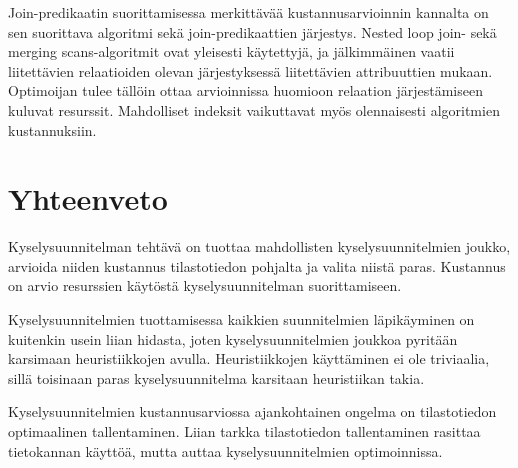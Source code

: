 \documentclass[finnish]{tktltiki2}
\theoremstyle{definition}
\theoremstyle{remark}
\begin{document}
Join-predikaatin suorittamisessa merkittävää kustannusarvioinnin kannalta on sen suorittava algoritmi sekä join-predikaattien järjestys. Nested loop join- sekä merging scans-algoritmit ovat yleisesti käytettyjä, ja jälkimmäinen vaatii liitettävien relaatioiden olevan järjestyksessä liitettävien attribuuttien mukaan. Optimoijan tulee tällöin ottaa arvioinnissa huomioon relaation järjestämiseen kuluvat resurssit. Mahdolliset indeksit vaikuttavat myös olennaisesti algoritmien kustannuksiin. 
\section{Yhteenveto}
Kyselysuunnitelman tehtävä on tuottaa mahdollisten kyselysuunnitelmien joukko, arvioida niiden kustannus tilastotiedon pohjalta ja valita niistä paras. Kustannus on arvio resurssien käytöstä kyselysuunnitelman suorittamiseen. 

Kyselysuunnitelmien tuottamisessa kaikkien suunnitelmien läpikäyminen on kuitenkin usein liian hidasta, joten kyselysuunnitelmien joukkoa pyritään karsimaan heuristiikkojen avulla. Heuristiikkojen käyttäminen ei ole triviaalia, sillä toisinaan paras kyselysuunnitelma karsitaan heuristiikan takia.

Kyselysuunnitelmien kustannusarviossa ajankohtainen ongelma on tilastotiedon optimaalinen tallentaminen. Liian tarkka tilastotiedon tallentaminen rasittaa tietokannan käyttöä, mutta auttaa kyselysuunnitelmien optimoinnissa.
\newpage



%


\end{document}
